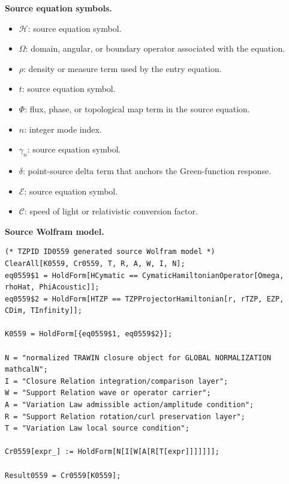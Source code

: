 \begin{minipage}[t]{0.49\linewidth}
\begingroup
\small
\raggedright
\textbf{Source equation symbols.}\par
\begin{itemize}[leftmargin=1.35em,itemsep=1pt,topsep=1pt,parsep=0pt]
    \item $\mathcal{H}$: source equation symbol.
    \item $\Omega$: domain, angular, or boundary operator associated with the equation.
    \item $\rho$: density or measure term used by the entry equation.
    \item $t$: source equation symbol.
    \item $\Phi$: flux, phase, or topological map term in the source equation.
    \item $n$: integer mode index.
    \item $\gamma_n$: source equation symbol.
    \item $\delta$: point-source delta term that anchors the Green-function response.
    \item $\mathcal{E}$: source equation symbol.
    \item $\mathcal{C}$: speed of light or relativistic conversion factor.
\end{itemize}
\endgroup
\end{minipage}\hfill
\begin{minipage}[t]{0.47\linewidth}
\begingroup
\scriptsize
\raggedright
\textbf{Source Wolfram model.}\par
\begin{Verbatim}[fontsize=\tiny,breaklines=true,breakanywhere=true]
(* TZPID ID0559 generated source Wolfram model *)
ClearAll[K0559, Cr0559, T, R, A, W, I, N];
eq0559$1 = HoldForm[HCymatic == CymaticHamiltonianOperator[Omega, rhoHat, PhiAcoustic]];
eq0559$2 = HoldForm[HTZP == TZPProjectorHamiltonian[r, rTZP, EZP, CDim, TInfinity]];

K0559 = HoldForm[{eq0559$1, eq0559$2}];

N = "normalized TRAWIN closure object for GLOBAL NORMALIZATION mathcalN";
I = "Closure Relation integration/comparison layer";
W = "Support Relation wave or operator carrier";
A = "Variation Law admissible action/amplitude condition";
R = "Support Relation rotation/curl preservation layer";
T = "Variation Law local source condition";

Cr0559[expr_] := HoldForm[N[I[W[A[R[T[expr]]]]]]];

Result0559 = Cr0559[K0559];
\end{Verbatim}
\endgroup
\end{minipage}

